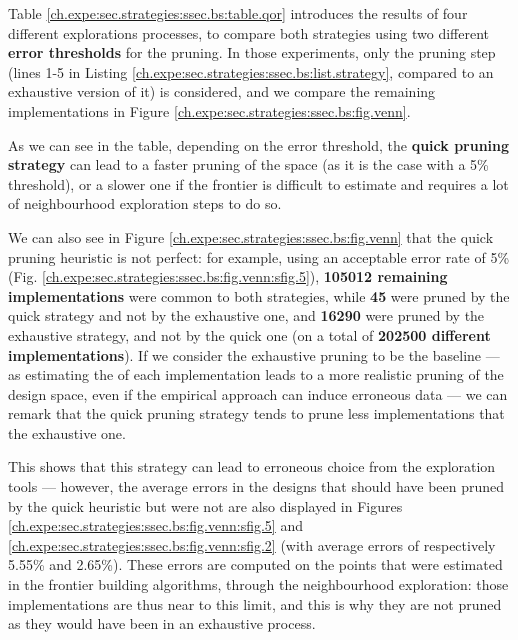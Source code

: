                 Table \ref{ch.expe:sec.strategies:ssec.bs:table.qor} introduces the results of four different explorations processes, to compare both strategies using two different {\bf error thresholds} for the pruning.
                In those experiments, only the pruning step (lines 1-5 in Listing \ref{ch.expe:sec.strategies:ssec.bs:list.strategy}, compared to an exhaustive version of it) is considered, and we compare the remaining implementations in Figure \ref{ch.expe:sec.strategies:ssec.bs:fig.venn}.

                As we can see in the table, depending on the error threshold, the {\bf quick pruning strategy} can lead to a faster pruning of the space (as it is the case with a 5\% threshold), or a slower one if the frontier is difficult to estimate and requires a lot of neighbourhood exploration steps to do so.

                We can also see in Figure \ref{ch.expe:sec.strategies:ssec.bs:fig.venn} that the quick pruning heuristic is not perfect: %
                for example, using an acceptable error rate of 5\% (Fig. \ref{ch.expe:sec.strategies:ssec.bs:fig.venn:sfig.5}), {\bf 105012 remaining implementations} were common to both strategies, while {\bf 45} were pruned by the quick strategy and not by the exhaustive one, and {\bf 16290} were pruned by the exhaustive strategy, and not by the quick one (on a total of {\bf 202500 different implementations}).
                If we consider the exhaustive pruning to be the baseline --- as estimating the  of each implementation leads to a more realistic pruning of the design space, even if the empirical approach can induce erroneous data --- we can remark that the quick pruning strategy tends to prune less implementations that the exhaustive one.

                This shows that this strategy can lead to erroneous choice from the exploration tools --- however, the average errors in the designs that should have been pruned by the quick heuristic but were not are also displayed in Figures \ref{ch.expe:sec.strategies:ssec.bs:fig.venn:sfig.5} and \ref{ch.expe:sec.strategies:ssec.bs:fig.venn:sfig.2} (with average errors of respectively 5.55\% and 2.65\%).
                These errors are computed on the points that were estimated in the frontier building algorithms, through the neighbourhood exploration: those implementations are thus near to this limit, and this is why they are not pruned as they would have been in an exhaustive process.

